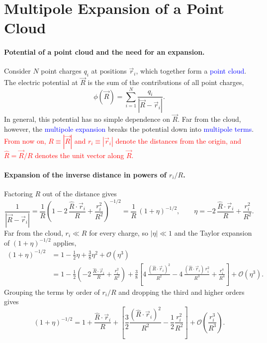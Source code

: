 \section{Multipole Expansion of a Point Cloud}
\label{sec:multipole}

\paragraph{Potential of a point cloud and the need for an expansion.}
Consider $N$ point charges $q_i$ at positions $\vec r_i$, which together form a \textcolor{blue}{point cloud}. The electric potential at $\vec R$ is the sum of the contributions of all point charges,
\begin{equation*}
    \phi(\vec R) = \sum_{i=1}^{N} \frac{q_i}{|\vec R - \vec r_i|}.
\end{equation*}
In general, this potential has no simple dependence on $\vec R$. Far from the cloud, however, the \textcolor{blue}{multipole expansion} breaks the potential down into \textcolor{blue}{multipole terms}. \textcolor{red}{From now on, $R \equiv |\vec R|$ and $r_i \equiv |\vec r_i|$ denote the distances from the origin, and $\hat R = \vec R/R$ denotes the unit vector along $\vec R$.}

\paragraph{Expansion of the inverse distance in powers of $r_i/R$.}
Factoring $R$ out of the distance gives
\begin{equation*}
    \frac{1}{|\vec R - \vec r_i|}
    = \frac{1}{R}\left(1 - 2\,\frac{\hat R\cdot\vec r_i}{R} + \frac{r_i^2}{R^2}\right)^{-1/2}
    = \frac{1}{R}\,(1+\eta)^{-1/2},
    \qquad
    \eta = -2\,\frac{\hat R\cdot\vec r_i}{R} + \frac{r_i^2}{R^2}.
\end{equation*}
Far from the cloud, $r_i \ll R$ for every charge, so $|\eta| \ll 1$ and the Taylor expansion of $(1+\eta)^{-1/2}$ applies,
\begin{align*}
    (1+\eta)^{-1/2}
    &= 1 - \frac{1}{2}\eta + \frac{3}{8}\eta^2 + \mathcal{O}(\eta^3)\\
    &= 1 - \frac{1}{2}\left(-2\,\frac{\hat R\cdot\vec r_i}{R} + \frac{r_i^2}{R^2}\right)
       + \frac{3}{8}\left[4\,\frac{(\hat R\cdot\vec r_i)^2}{R^2}
       - 4\,\frac{(\hat R\cdot\vec r_i)\,r_i^2}{R^3}
       + \frac{r_i^4}{R^4}\right]
       + \mathcal{O}(\eta^3).
\end{align*}
Grouping the terms by order of $r_i/R$ and dropping the third and higher orders gives
\begin{equation*}
    (1+\eta)^{-1/2}
    = 1 + \frac{\hat R\cdot\vec r_i}{R}
      + \left[\frac{3}{2}\frac{(\hat R\cdot\vec r_i)^2}{R^2} - \frac{1}{2}\frac{r_i^2}{R^2}\right]
      + \mathcal{O}\!\left(\frac{r_i^3}{R^3}\right).
\end{equation*}

